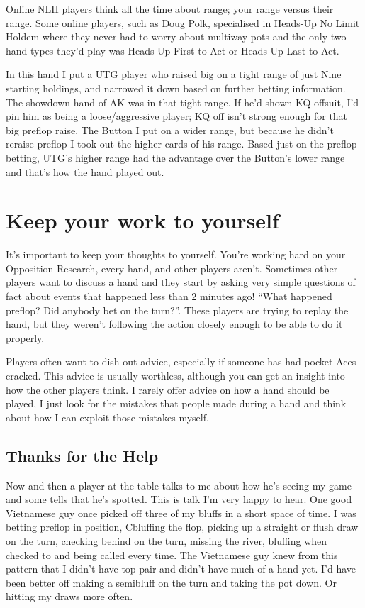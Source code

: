 Online NLH players think all the time about range; your
range versus their range. Some online players, such as Doug Polk,
specialised in Heads-Up No Limit Holdem where they never had to worry
about multiway pots and the only two hand types they'd play was Heads
Up First to Act or Heads Up Last to Act.

In this hand I put a UTG player who raised
big on a tight range of just Nine starting holdings, and narrowed it
down based on further betting information. The showdown hand of AK was
in that tight range. If he'd shown KQ offsuit, I'd pin him as being a
loose/aggressive player; KQ off isn't strong enough for that big
preflop raise. The Button I put on a wider range, but because he
didn't reraise preflop I took out the higher cards of his range. Based
just on the preflop betting, UTG's higher range had the advantage over
the Button's lower range and that's how the hand played out.

\section{Keep your work to yourself}

It's important to keep your thoughts to yourself. You're working
hard on your Opposition Research, every hand, and other players aren't.
Sometimes other players want to discuss a hand and they start by asking
very simple questions of fact about events that happened less than
2 minutes ago! ``What happened preflop? Did anybody bet on the turn?''.
These players are trying to replay the hand, but they weren't following
the action closely enough to be able to do it properly.

Players often want to dish out advice, especially if someone has had
pocket Aces cracked. This advice is usually worthless, although you
can get an insight into how the other players think. I rarely offer
advice on how a hand should be played, I just look for the mistakes
that people made during a hand and think about how I can exploit
those mistakes myself.

\subsection*{Thanks for the Help}

Now and then a player at the table talks to me about how he's seeing my
game and some tells that he's spotted. This is talk I'm very happy to
hear. One good Vietnamese guy once picked off three of my bluffs in a short
space of time. I was betting preflop in position, Cbluffing the flop,
picking up a straight or flush draw on the turn, checking behind on the turn,
missing the river, bluffing when checked to and being called every time.
The Vietnamese guy knew from this pattern that I didn't have top pair
and didn't have much of a hand yet. I'd have been better off making a
semibluff on the turn and taking the pot down. Or hitting my draws
more often.

